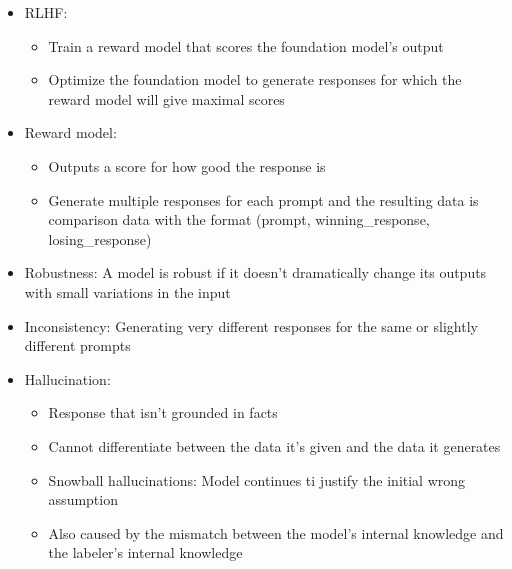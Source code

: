 \documentclass[11pt]{scrartcl}
\begin{document}
\begin{itemize}
	\item RLHF:
	\begin{itemize}
		\item Train a reward model that scores the foundation model's output
		\item Optimize the foundation model to generate responses for which the reward model will give maximal scores
	\end{itemize}
	\item Reward model: 
	\begin{itemize}
		\item Outputs a score for how good the response is
		\item Generate multiple responses for each prompt and the resulting data is comparison data with the format (prompt, winning\_response, losing\_response)
	\end{itemize}
	\item Robustness: A model is robust if it doesn't dramatically change its outputs with small variations in the input
	\item Inconsistency: Generating very different responses for the same or slightly different prompts
	\item Hallucination:
	\begin{itemize}
		\item Response that isn't grounded in facts
		\item Cannot differentiate between the data it's given and the data it generates
		\item Snowball hallucinations: Model continues ti justify the initial wrong assumption
		\item Also caused by the mismatch between the model's internal knowledge and the labeler's internal knowledge
	\end{itemize}
\end{itemize}
\end{document}
